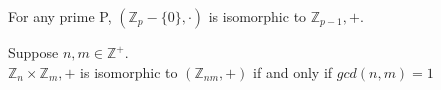 \begin{theorm}
    For any prime P, \((\mathbb Z_p - \{0\}, \cdot)\) is isomorphic to \(\mathbb Z_{p-1}, +\).
\end{theorm}
\begin{theorm}
    Suppose \(n,m \in \mathbb Z^+\).\\
    \(\mathbb Z_n \times \mathbb Z_m, +\) is isomorphic to \((\mathbb Z_{nm}, +)\) if and only if \(gcd(n,m) = 1\)
\end{theorm}